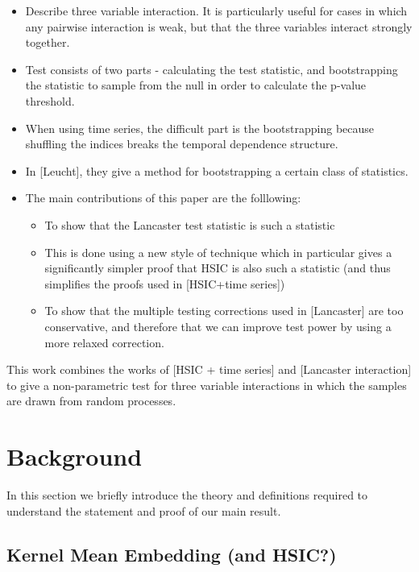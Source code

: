 \documentclass{article}
\begin{document}
\begin{itemize}
\item Describe three variable interaction. It is particularly useful for cases in which any pairwise interaction is weak, but that the three variables interact strongly together.
\item Test consists of two parts - calculating the test statistic, and bootstrapping the statistic to sample from the null in order to calculate the p-value threshold.
\item When using time series, the difficult part is the bootstrapping because shuffling the indices breaks the temporal dependence structure.
\item In [Leucht], they give a method for bootstrapping a certain class of statistics.
\item The main contributions of this paper are the folllowing:
\begin{itemize}
\item To show that the Lancaster test statistic is such a statistic
\item This is done using a new style of technique which in particular gives a significantly simpler proof that HSIC is also such a statistic (and thus simplifies the proofs used in [HSIC+time series])
\item To show that the multiple testing corrections used in [Lancaster] are too conservative, and therefore that we can improve test power by using a more relaxed correction.
\end{itemize}
\end{itemize}


This work combines the works of [HSIC + time series] and [Lancaster interaction] to give a non-parametric test for three variable interactions in which the samples are drawn from random processes.

\section{Background} 

In this section we briefly introduce the theory and definitions required to understand the statement and proof of our main result.

\subsection{Kernel Mean Embedding (and HSIC?)}
\end{document}

